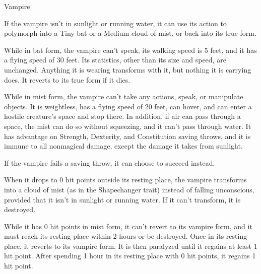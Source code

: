 \begin{DndMonster}[float*=hb, width=\textwidth + 8pt]{Vampire}
\begin{multicols}{2}
\DndMonsterBasics[armor-class={16 (natural armor)}, hit-points={170 (20d8 + 80)}, speed={30 ft.}]
\DndMonsterDetails[saving-throws={}, skills={Perception +7, Stealth +9}, damage-immunities={}, damage-resistances={necrotic}, damage-vulnerabilities={}, condition-immunities={}, senses={darkvision 120 ft., passive Perception 17}, languages={the languages it knew in life}, challenge={9:11}]
 If the vampire isn't in sunlight or running water, it can use its action to polymorph into a Tiny bat or a Medium cloud of mist, or back into its true form.

While in bat form, the vampire can't speak, its walking speed is 5 feet, and it has a flying speed of 30 feet. Its statistics, other than its size and speed, are unchanged. Anything it is wearing transforms with it, but nothing it is carrying does. It reverts to its true form if it dies.

While in mist form, the vampire can't take any actions, speak, or manipulate objects. It is weightless, has a flying speed of 20 feet, can hover, and can enter a hostile creature's space and stop there. In addition, if air can pass through a space, the mist can do so without squeezing, and it can't pass through water. It has advantage on Strength, Dexterity, and Constitution saving throws, and it is immune to all nonmagical damage, except the damage it takes from sunlight.

 If the vampire fails a saving throw, it can choose to succeed instead.

 When it drops to 0 hit points outside its resting place, the vampire transforms into a cloud of mist (as in the Shapechanger trait) instead of falling unconscious, provided that it isn't in sunlight or running water. If it can't transform, it is destroyed.

While it has 0 hit points in mist form, it can't revert to its vampire form, and it must reach its resting place within 2 hours or be destroyed. Once in its resting place, it reverts to its vampire form. It is then paralyzed until it regains at least 1 hit point. After spending 1 hour in its resting place with 0 hit points, it regains 1 hit point.


\end{multicols}
\end{DndMonster}
